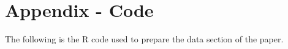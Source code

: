 \section{Appendix - Code}

The following is the R code used to prepare the data section of the paper.


